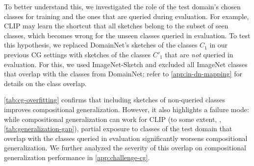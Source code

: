 To better understand this, we investigated the role of the test domain's chosen classes for training and the ones that are queried during evaluation. For example, CLIP may learn the shortcut that all sketches belong to the subset of seen classes, which becomes wrong for the unseen classes queried in evaluation.
To test this hypothesis, we replaced DomainNet's sketches of the classes $C_1$ in our previous CG settings with sketches of the classes $C'_1$ that are \emph{not} queried in evaluation. For this, we used ImageNet-Sketch \citep{wang2019learning} and excluded all ImageNet classes that overlap with the classes from DomainNet; refer to \cref{app:in-dn-mapping} for details on the class overlap.

\begin{table}[t]
    \centering
    \caption{\textbf{Seeing a subset of classes of the test domain can worsen compositional generalization.} Including a subset of sketches from DomainNet (CG low/high-diversity) slightly decreases performance on the unseen sketch classes $C_2$ compared to not seeing that domain at all (Leave-out-domain). However, adding sketches of classes that do not overlap with DomainNet's classes, instead improves compositional generalization performance, suggesting that compositional generalization can be limited by (only) partial, suboptimal inclusion of the test domain.}
    \label{tab:cg-overfitting}
\end{table}
\cref{tab:cg-overfitting} confirms that including sketches of non-queried classes improves compositional generalization. However, it also highlights a failure mode: while compositional generalization can work for CLIP (to some extent, \cf, \cref{tab:generalization-gap}), partial exposure to classes of the test domain that overlap with the classes queried in evaluation significantly worsens compositional generalization. We further analyzed the severity of this overlap on compositional generalization performance in \cref{app:challenge-cg}.

